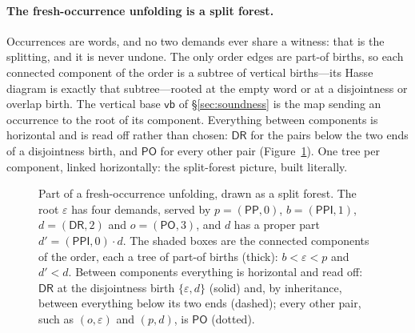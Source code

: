 \documentclass[11pt]{article}
\newcommand{\DR}{\mathsf{DR}}
\newcommand{\PO}{\mathsf{PO}}
\newcommand{\PP}{\mathsf{PP}}
\newcommand{\PPI}{\mathsf{PPI}}
\newcommand{\vb}{\mathsf{vb}}
\theoremstyle{plain}
\theoremstyle{definition}
\begin{document}
\paragraph{The fresh-occurrence unfolding is a split forest.} Occurrences are
words, and no two demands ever share a witness: that is the splitting, and it
is never undone. The only order edges are part-of births, so each connected
component of the order is a subtree of vertical births---its Hasse diagram is
exactly that subtree---rooted at the empty word or at a disjointness or
overlap birth. The vertical base $\vb$ of \S\ref{sec:soundness} is the map
sending an occurrence to the root of its component. Everything between
components is horizontal and is read off rather than chosen: $\DR$ for the
pairs below the two ends of a disjointness birth, and $\PO$ for every other
pair (Figure~\ref{fig:splitforest}). One tree per component, linked
horizontally: the split-forest picture, built literally.

\begin{figure}[t]
\centering
{}
\caption{Part of a fresh-occurrence unfolding, drawn as a split forest. The
root $\varepsilon$ has four demands, served by $p=(\PP,0)$, $b=(\PPI,1)$,
$d=(\DR,2)$ and $o=(\PO,3)$, and $d$ has a proper part $d'=(\PPI,0)\cdot d$.
The shaded boxes are the connected components of the order, each a tree of
part-of births (thick): $b<\varepsilon<p$ and $d'<d$. Between components
everything is horizontal and read off: $\DR$ at the disjointness birth
$\{\varepsilon,d\}$ (solid) and, by inheritance, between everything below its
two ends (dashed); every other pair, such as $(o,\varepsilon)$ and $(p,d)$, is
$\PO$ (dotted).}
\label{fig:splitforest}
\end{figure}
\end{document}
